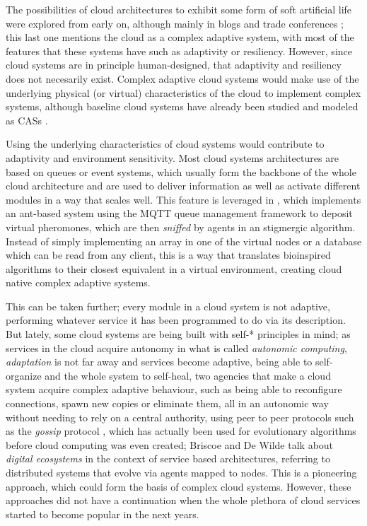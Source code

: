 \documentclass[utf8]{frontiersSCNS} %
\begin{document}
The possibilities of cloud architectures to exhibit some form of soft
artificial life were explored from early on, although mainly in blogs
and trade conferences \citep{burela09:Azure,hakimi}; this last one
mentions the cloud as a complex adaptive system, with most of the
features that these systems have such as adaptivity or resiliency.
However, since cloud systems are in principle
human-designed, that adaptivity and resiliency does not necesarily
exist. Complex adaptive cloud systems would make use of the underlying physical (or
virtual) characteristics of the cloud to implement complex
systems, although baseline cloud systems have already been studied and
modeled as CASs \citep{chen2013cloud}.

Using the underlying characteristics of cloud systems would
contribute to adaptivity and environment sensitivity.
Most cloud systems architectures are based on queues or event systems, which
usually form the backbone of the whole cloud architecture and are used to deliver
information as well as activate different modules in a way that scales
well. This feature is leveraged in \citep{bottone2016implementing}, which
implements an ant-based system using the MQTT queue management
framework to deposit virtual pheromones, which are then {\em sniffed} by
agents in an stigmergic algorithm. Instead of simply implementing an
array in one of the virtual nodes or a database which can be read from
any client, this is a way that translates bioinspired algorithms to
their closest equivalent in a virtual environment, creating cloud
native complex adaptive systems.

This can be taken further; every module in a cloud system is not
adaptive, performing whatever service it has been programmed to do via
its description. But lately, some cloud systems are being built with
self-* principles in mind; as services in the cloud acquire autonomy
in what is called {\em autonomic computing}, {\em adaptation} is not far away
and services become adaptive, being able to self-organize and the
whole system to self-heal, two agencies that make a cloud system
acquire complex adaptive behaviour, such as being able to reconfigure
connections, spawn new copies or eliminate them, all in an autonomic
way without needing to rely on a central authority, using peer to peer
protocols such as the {\em gossip} protocol \citep{LNCS44480129}, which has
actually been used for evolutionary algorithms \citep{laredo09cache} before
cloud computing was even created;  Briscoe and De Wilde
\citep{DBLP:journals/corr/abs-1101-5428,DBLP:journals/corr/abs-0712-4102}
  talk about {\em digital ecosystems} in the context of service based
  architectures, referring to distributed systems that evolve via
  agents mapped to nodes. This is a pioneering approach, which could
  form the basis of complex cloud systems. However, these approaches
  did not have a continuation when the whole plethora of cloud
  services started to become popular in the next years.
\end{document}

